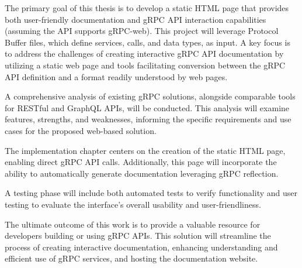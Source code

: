 %
%
%
%

The primary goal of this thesis is to develop a static HTML page that provides both user-friendly documentation and gRPC API interaction capabilities (assuming the API supports gRPC-web).
This project will leverage Protocol Buffer files, which define services, calls, and data types, as input.
A key focus is to address the challenges of creating interactive gRPC API documentation by utilizing a static web page and tools facilitating conversion between the gRPC API definition and a format readily understood by web pages.

A comprehensive analysis of existing gRPC solutions, alongside comparable tools for RESTful and GraphQL APIs, will be conducted.
This analysis will examine features, strengths, and weaknesses, informing the specific requirements and use cases for the proposed web-based solution.

The implementation chapter centers on the creation of the static HTML page, enabling direct gRPC API calls.
Additionally, this page will incorporate the ability to automatically generate documentation leveraging gRPC reflection.

A testing phase will include both automated tests to verify functionality and user testing to evaluate the interface's overall usability and user-friendliness.

The ultimate outcome of this work is to provide a valuable resource for developers building or using gRPC APIs.
This solution will streamline the process of creating interactive documentation, enhancing understanding and efficient use of gRPC services, and hosting the documentation website.